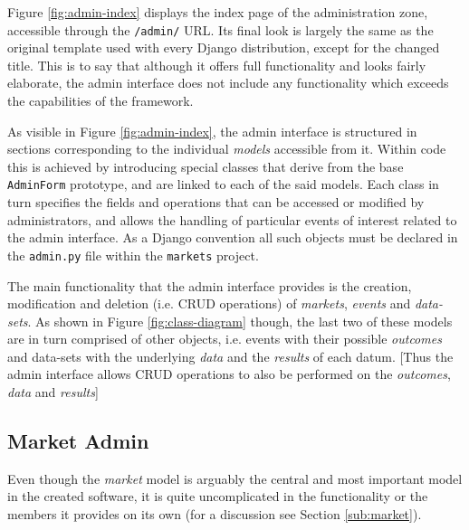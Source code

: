 \documentclass[bsc,frontabs,twoside,singlespacing,parskip,deptreport]{infthesis}     %
\begin{document}
	Figure \ref{fig:admin-index} displays the index page of the administration zone, accessible through the {\tt /admin/} URL. Its final look is largely the same as the original template used with every Django distribution, except for the changed title. This is to say that although it offers full functionality and looks fairly elaborate, the admin interface does not include any functionality which exceeds the capabilities of the framework. 

	As visible in Figure \ref{fig:admin-index}, the admin interface is structured in sections corresponding to the individual {\it models} accessible from it. Within code this is achieved by introducing special classes that derive from the base {\tt AdminForm} prototype, and are linked to each of the said models. Each class in turn specifies the fields and operations that can be accessed or modified by administrators, and allows the handling of particular events of interest related to the admin interface. As a Django convention all such objects must be declared in the {\tt admin.py} file within the {\tt markets} project. 

		The main functionality that the admin interface provides is the creation, modification and deletion (i.e. CRUD operations) of {\it markets}, {\it events} and {\it data-sets}. As shown in Figure \ref{fig:class-diagram} though, the last two of these models are in turn comprised of other objects, i.e. events with their possible {\it outcomes} and data-sets with the underlying {\it data} and the {\it results} of each datum. [Thus the admin interface allows CRUD operations to also be performed on the {\it outcomes}, {\it data} and {\it results}]

\subsection{Market Admin}

	Even though the {\it market} model is arguably the central and most important model in the created software, it is quite uncomplicated in the functionality or the members it provides on its own (for a discussion see Section \ref{sub:market}).  
\end{document}
